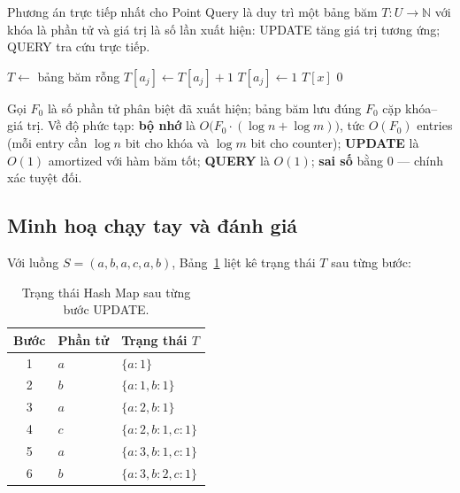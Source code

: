 Phương án trực tiếp nhất cho Point Query là duy trì một bảng băm $T: U \to \mathbb{N}$ với khóa là phần tử và giá trị là số lần xuất hiện: UPDATE tăng giá trị tương ứng; QUERY tra cứu trực tiếp.

\begin{algorithm}[H]
\caption{Exact Hash Map --- UPDATE và QUERY}
\label{alg:hashmap}
\begin{algorithmic}[1]
\State $T \gets$ bảng băm rỗng
\Statex
{}
    \State $T[a_j] \gets T[a_j] + 1$
  \Else
    \State $T[a_j] \gets 1$
  \EndIf
\EndFunction
\Statex
{}
    \State \Return $T[x]$
  \Else
    \State \Return $0$
  \EndIf
\EndFunction
\end{algorithmic}
\end{algorithm}

Gọi $F_0$ là số phần tử phân biệt đã xuất hiện; bảng băm lưu đúng $F_0$ cặp khóa--giá trị. Về độ phức tạp: \textbf{bộ nhớ} là $O\bigl(F_0 \cdot (\log n + \log m)\bigr)$, tức $O(F_0)$ entries (mỗi entry cần $\log n$ bit cho khóa và $\log m$ bit cho counter); \textbf{UPDATE} là $O(1)$ amortized với hàm băm tốt; \textbf{QUERY} là $O(1)$; \textbf{sai số} bằng $0$ --- chính xác tuyệt đối.

\subsection{Minh hoạ chạy tay và đánh giá}

Với luồng $S = (a, b, a, c, a, b)$, Bảng~\ref{tab:hashmap-trace} liệt kê trạng thái $T$ sau từng bước:

\begin{table}[H]
  \centering
  \caption{Trạng thái Hash Map sau từng bước UPDATE.}
  \label{tab:hashmap-trace}
  \begin{tabular}{@{}c l l@{}}
    \toprule
    \textbf{Bước} & \textbf{Phần tử} & \textbf{Trạng thái $T$} \\
    \midrule
    1 & $a$ & $\{a: 1\}$ \\
    2 & $b$ & $\{a: 1, b: 1\}$ \\
    3 & $a$ & $\{a: 2, b: 1\}$ \\
    4 & $c$ & $\{a: 2, b: 1, c: 1\}$ \\
    5 & $a$ & $\{a: 3, b: 1, c: 1\}$ \\
    6 & $b$ & $\{a: 3, b: 2, c: 1\}$ \\
    \bottomrule
  \end{tabular}
\end{table}

